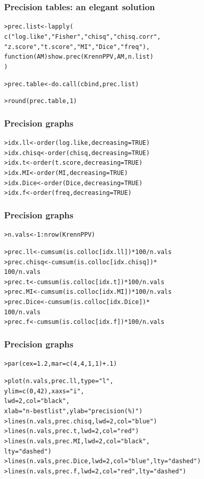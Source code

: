 \documentclass[t]{beamer} %
\begin{document}
\begin{frame}[fragile]
  \frametitle{Precision tables: an elegant solution}

  \begin{alltt}
> prec.list <- lapply(
    c("log.like", "Fisher", "chisq", "chisq.corr", 
      "z.score", "t.score", "MI", "Dice", "freq"), 
    function (AM) show.prec(KrennPPV, AM, n.list)
  )

> prec.table <- do.call(cbind, prec.list)


> round(prec.table, 1) 
  \end{alltt}
\end{frame}

\begin{frame}[fragile]
  \frametitle{Precision graphs}

  \begin{alltt}
> idx.ll <- order(log.like, decreasing=TRUE)
> idx.chisq <- order(chisq, decreasing=TRUE)
> idx.t <- order(t.score, decreasing=TRUE)
> idx.MI <- order(MI, decreasing=TRUE)
> idx.Dice <- order(Dice, decreasing=TRUE)
> idx.f <- order(freq, decreasing=TRUE)
 \end{alltt}
\end{frame}

\begin{frame}[fragile]
  \frametitle{Precision graphs}

  \begin{alltt}
> n.vals <- 1:nrow(KrennPPV)

> prec.ll <- cumsum(is.colloc[idx.ll]) * 100 /  n.vals
> prec.chisq <- cumsum(is.colloc[idx.chisq]) *
  100 / n.vals
> prec.t <- cumsum(is.colloc[idx.t]) * 100 / n.vals
> prec.MI <- cumsum(is.colloc[idx.MI]) * 100 / n.vals
> prec.Dice <- cumsum(is.colloc[idx.Dice]) *
  100 / n.vals
> prec.f <- cumsum(is.colloc[idx.f]) * 100 / n.vals
  \end{alltt}
\end{frame}

\begin{frame}[fragile]
  \frametitle{Precision graphs}

  \begin{alltt}
> par(cex=1.2, mar=c(4,4,1,1)+.1)

> plot(n.vals, prec.ll, type="l", 
  ylim=c(0,42), xaxs="i", 
  lwd=2, col="black",     
  xlab="n-best list", ylab="precision (\%)")
> lines(n.vals, prec.chisq, lwd=2, col="blue")
> lines(n.vals, prec.t, lwd=2, col="red")
> lines(n.vals, prec.MI, lwd=2, col="black",
  lty="dashed") 
> lines(n.vals, prec.Dice, lwd=2, col="blue", lty="dashed")
> lines(n.vals, prec.f, lwd=2, col="red", lty="dashed")
  \end{alltt}
\end{frame}
\end{document}
